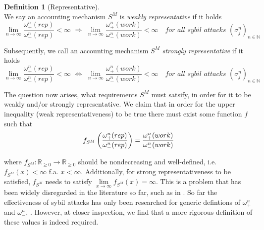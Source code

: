 \documentclass[11pt,a4paper]{report}
\theoremstyle{definition}
\newtheorem{definition}{Definition}[section]
\theoremstyle{theorem}
\theoremstyle{proposition}
\theoremstyle{corollary}
\theoremstyle{lemma}
\theoremstyle{example}
\theoremstyle{remark}
\begin{document}
\begin{definition}[Representative]\ \\
\noindent{}We say an accounting mechanism $S^M$ is {\it weakly representative} if it holds \vspace{1em}\\

\[
\lim\limits_{n\rightarrow\infty}\frac{\omega^n_{+}(rep)}{\omega^n_{-}(rep)}<\infty\,\, \Longrightarrow \,\,\lim\limits_{n\rightarrow\infty}\frac{\omega^n_{+}(work)}{\omega^n_{-}(work)}<\infty \quad\textit{for all sybil attacks }(\sigma_j^n)_{n\in\mathbb{N}}
\]

\noindent{}Subsequently, we call an accounting mechanism $S^M$ {\it strongly representative} if it holds \vspace{1em}\\

\[
\lim\limits_{n\rightarrow\infty}\frac{\omega^n_{+}(rep)}{\omega^n_{-}(rep)}<\infty\,\, \Longleftrightarrow  \,\,\lim\limits_{n\rightarrow\infty}\frac{\omega^n_{+}(work)}{\omega^n_{-}(work)}<\infty \quad\textit{for all sybil attacks }(\sigma_j^n)_{n\in\mathbb{N}}
\]

\end{definition}

\noindent{}The question now arises, what requirements $S^M$ must satsify, in order for it to be weakly and/or strongly representative. We claim that in order for the upper inequality (weak representativeness) to be true there must exist some function $f$ such that \vspace{1em}\\

\[
f_{S^M}\left(\frac{\omega^{n}_{+}(rep)}{\omega^{n}_{-}(rep)}\right) = \frac{\omega^{n}_{+}(work)}{\omega^{n}_{-}(work)} \vspace{1em}\\
\]

\noindent{}where $f_{S^M}:\mathbb{R}_{\geq{}0}\rightarrow\mathbb{R}_{\geq{}0}$ should be nondecreasing and well-defined, i.e. $f_{S^M}(x)<\infty$ f.a. $x<\infty$. Additionally, for strong representativeness to be satisfied, $f_{S^M}$ needs to satisfy $\lim\limits_{x\rightarrow\infty}f_{S^M}(x)=\infty$. This is a problem that has been widely disregarded in the literature so far, such as in \cite{A Random Walk Based Trust Ranking in Distributed Systems}. So far the effectiveness of sybil attacks has only been researched for generic defintions of $\omega_{+}^{n}$ and $\omega_{-}^{n}$, \cite{On the Sybil-Proofness of Accounting Mechanisms}. However, at closer inspection, we find that a more rigorous definition of these values is indeed required. \vspace{1em}\\ 
\end{document}
